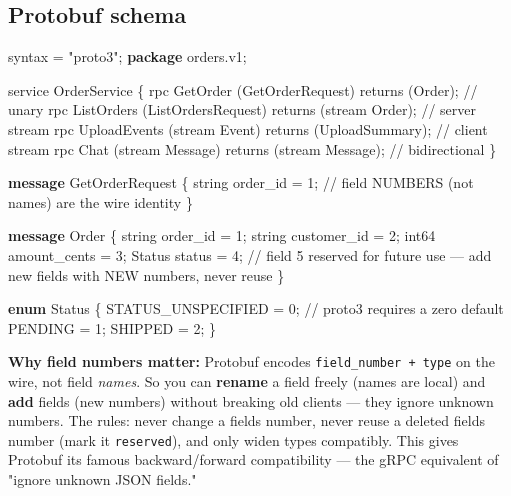 \documentclass[11pt]{article}
\newenvironment{Shaded}{\begin{snugshade}}{\end{snugshade}}
\newcommand{\CommentTok}[1]{\textcolor[rgb]{0.48,0.49,0.49}{#1}}
\newcommand{\DataTypeTok}[1]{\textcolor[rgb]{0.16,0.50,0.73}{#1}}
\newcommand{\DecValTok}[1]{\textcolor[rgb]{0.96,0.45,0.00}{#1}}
\newcommand{\KeywordTok}[1]{\textcolor[rgb]{0.81,0.81,0.76}{\textbf{#1}}}
\newcommand{\NormalTok}[1]{\textcolor[rgb]{0.81,0.81,0.76}{#1}}
\newcommand{\StringTok}[1]{\textcolor[rgb]{0.96,0.31,0.31}{#1}}
\begin{document}
\subsection{Protobuf schema}\label{protobuf-schema}


\begin{Shaded}
\begin{Highlighting}[]
\NormalTok{syntax = }\StringTok{"proto3"}\NormalTok{;}
\KeywordTok{package}\NormalTok{ orders.v1;}

\NormalTok{service OrderService \{}
\NormalTok{  rpc GetOrder   (GetOrderRequest)  returns (Order);                 }\CommentTok{// unary}
\NormalTok{  rpc ListOrders (ListOrdersRequest) returns (stream Order);        }\CommentTok{// server stream}
\NormalTok{  rpc UploadEvents (stream Event)   returns (UploadSummary);         }\CommentTok{// client stream}
\NormalTok{  rpc Chat       (stream Message)   returns (stream Message);        }\CommentTok{// bidirectional}
\NormalTok{\}}

\KeywordTok{message}\NormalTok{ GetOrderRequest \{}
  \DataTypeTok{string}\NormalTok{ order\_id = }\DecValTok{1}\NormalTok{;            }\CommentTok{// field NUMBERS (not names) are the wire identity}
\NormalTok{\}}

\KeywordTok{message}\NormalTok{ Order \{}
  \DataTypeTok{string}\NormalTok{ order\_id    = }\DecValTok{1}\NormalTok{;}
  \DataTypeTok{string}\NormalTok{ customer\_id = }\DecValTok{2}\NormalTok{;}
  \DataTypeTok{int64}\NormalTok{  amount\_cents = }\DecValTok{3}\NormalTok{;}
\NormalTok{  Status status      = }\DecValTok{4}\NormalTok{;}
  \CommentTok{// field 5 reserved for future use — add new fields with NEW numbers, never reuse}
\NormalTok{\}}

\KeywordTok{enum}\NormalTok{ Status \{}
\NormalTok{  STATUS\_UNSPECIFIED = }\DecValTok{0}\NormalTok{;   }\CommentTok{// proto3 requires a zero default}
\NormalTok{  PENDING = }\DecValTok{1}\NormalTok{;}
\NormalTok{  SHIPPED = }\DecValTok{2}\NormalTok{;}
\NormalTok{\}}
\end{Highlighting}
\end{Shaded}

\textbf{Why field numbers matter:} Protobuf encodes \texttt{field\_number\ +\ type} on the wire, not field \emph{names}. So you can \textbf{rename} a field freely (names are local) and \textbf{add} fields (new numbers) without breaking old clients --- they ignore unknown numbers. The rules: never change a field\textquotesingle s number, never reuse a deleted field\textquotesingle s number (mark it \texttt{reserved}), and only widen types compatibly. This gives Protobuf its famous backward/forward compatibility --- the gRPC equivalent of "ignore unknown JSON fields."
\end{document}

